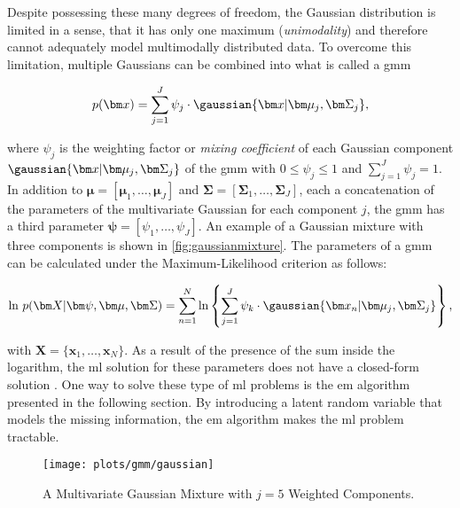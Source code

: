 Despite possessing these many degrees of freedom, the Gaussian distribution is limited in a sense, that it has only one maximum (\textit{unimodality}) and therefore cannot adequately model multimodally distributed data. To overcome this limitation, multiple Gaussians can be combined into what is called a \acrlong{gmm}

\begin{equation}
	p(\bm x)=\sum^J_{j=1}\psi_j\cdot\gaussian{\bm x\vert\bm\mu_j,\bm\Sigma_j},
\end{equation}

where $\psi_j$ is the weighting factor or \textit{mixing coefficient} of each Gaussian component $\gaussian{\bm x\vert\bm\mu_j,\bm\Sigma_j}$ of the \gls{gmm} with $0\leq\psi_j\leq 1$ and $\sum_{j=1}^J \psi_j=1$. In addition to $\bm\mu=[\bm\mu_1,\dots,\bm\mu_J]$ and $\bm\Sigma=[\bm\Sigma_1,\dots,\bm\Sigma_J]$, each a concatenation of the parameters of the multivariate Gaussian for each component $j$, the \gls{gmm} has a third parameter $\bm\psi=[\psi_1,\dots,\psi_J]$. An example of a Gaussian mixture with three components is shown in \autoref{fig:gaussianmixture}. The parameters of a \gls{gmm} can be calculated under the Maximum-Likelihood criterion as follows:

\begin{equation}
	\text{ln}\ p(\bm X\vert\bm\psi,\bm\mu,\bm\Sigma)=\sum_{n=1}^N \text{ln}\left\{\sum_{j=1}^J \psi_k\cdot\gaussian{\bm x_n\vert\bm\mu_j,\bm\Sigma_j} \right\},
\end{equation}

with $\bm X=\{\bm x_1,\dots,\bm x_N\}$. As a result of the presence of the sum inside the logarithm, the \gls{ml} solution for these parameters does not have a closed-form solution \cite[p.~113]{Bishop2006}. One way to solve these type of \gls{ml} problems is the \gls{em} algorithm presented in the following section. By introducing a latent random variable that models the missing information, the \gls{em} algorithm makes the \gls{ml} problem tractable.

\begin{figure}[!hbt]
    \texttt{[image: plots/gmm/gaussian]}
    \caption[Example of a Gaussian Mixture]{A Multivariate Gaussian Mixture with $j=5$ Weighted Components.}
    \label{fig:gaussianmixture}
\end{figure}

